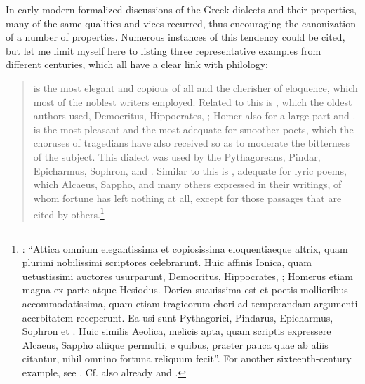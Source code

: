 In early modern formalized discussions of the Greek dialects and their properties, many of the same qualities and vices recurred, thus encouraging the canonization of a number of properties. Numerous instances of this tendency could be cited, but let me limit myself here to listing three representative examples from different centuries, which all have a clear link with philology:

\begin{quote}
 is the most elegant and copious of all and the cherisher of eloquence, which most of the noblest writers employed. Related to this is , which the oldest authors used, Democritus, Hippocrates, ; Homer also for a large part and .  is the most pleasant and the most adequate for smoother poets, which the choruses of tragedians have also received so as to moderate the bitterness of the subject. This dialect was used by the Pythagoreans, Pindar, Epicharmus, Sophron, and . Similar to this is , adequate for lyric poems, which Alcaeus, Sappho, and many others expressed in their writings, of whom fortune has left nothing at all, except for those passages that are cited by others.\footnote{\citet[a.3\textsc{\textsuperscript{v}}–a.4\textsc{\textsuperscript{r}}]{Canini1555}: “Attica omnium elegantissima et copiosissima eloquentiaeque altrix, quam plurimi nobilissimi scriptores celebrarunt. Huic affinis Ionica, quam uetustissimi auctores usurparunt, Democritus, Hippocrates, ; Homerus etiam magna ex parte atque Hesiodus. Dorica suauissima est et poetis mollioribus accommodatissima, quam etiam tragicorum chori ad temperandam argumenti acerbitatem receperunt. Ea usi sunt Pythagorici, Pindarus, Epicharmus, Sophron et . Huic similis Aeolica, melicis apta, quam scriptis expressere Alcaeus, Sappho aliique permulti, e quibus, praeter pauca quae ab aliis citantur, nihil omnino fortuna reliquum fecit”. For another sixteenth-century example, see \citet[138\textsc{\textsuperscript{v}}–139\textsc{\textsuperscript{r}}]{Vuidius1569}. Cf. also already \citet[12\textsc{\textsuperscript{v}}]{Lopad1536} and \citet[\textsc{a.6}\textsc{\textsuperscript{v}}\textsc{–a.7}\textsc{\textsuperscript{r}}]{Gessner1543}.}
\end{quote}

